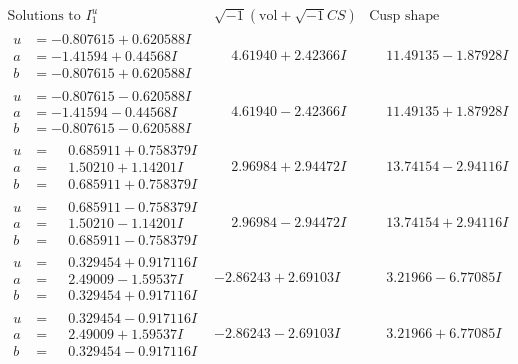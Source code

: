 \documentclass[1p]{elsarticle_modified}
\theoremstyle{definition}
\newcommand{\I}{\sqrt{-1}}
\begin{document}
$$\begin{array}{c|c|c}  
\text{Solutions to }I^u_{1}& \I (\text{vol} + \sqrt{-1}CS) & \text{Cusp shape}\\
 \hline 
\begin{aligned}
u &= -0.807615 + 0.620588 I \\
a &= -1.41594 + 0.44568 I \\
b &= -0.807615 + 0.620588 I\end{aligned}
 & \phantom{-}4.61940 + 2.42366 I & \phantom{-}11.49135 - 1.87928 I \\ \hline\begin{aligned}
u &= -0.807615 - 0.620588 I \\
a &= -1.41594 - 0.44568 I \\
b &= -0.807615 - 0.620588 I\end{aligned}
 & \phantom{-}4.61940 - 2.42366 I & \phantom{-}11.49135 + 1.87928 I \\ \hline\begin{aligned}
u &= \phantom{-}0.685911 + 0.758379 I \\
a &= \phantom{-}1.50210 + 1.14201 I \\
b &= \phantom{-}0.685911 + 0.758379 I\end{aligned}
 & \phantom{-}2.96984 + 2.94472 I & \phantom{-}13.74154 - 2.94116 I \\ \hline\begin{aligned}
u &= \phantom{-}0.685911 - 0.758379 I \\
a &= \phantom{-}1.50210 - 1.14201 I \\
b &= \phantom{-}0.685911 - 0.758379 I\end{aligned}
 & \phantom{-}2.96984 - 2.94472 I & \phantom{-}13.74154 + 2.94116 I \\ \hline\begin{aligned}
u &= \phantom{-}0.329454 + 0.917116 I \\
a &= \phantom{-}2.49009 - 1.59537 I \\
b &= \phantom{-}0.329454 + 0.917116 I\end{aligned}
 & -2.86243 + 2.69103 I & \phantom{-}3.21966 - 6.77085 I \\ \hline\begin{aligned}
u &= \phantom{-}0.329454 - 0.917116 I \\
a &= \phantom{-}2.49009 + 1.59537 I \\
b &= \phantom{-}0.329454 - 0.917116 I\end{aligned}
 & -2.86243 - 2.69103 I & \phantom{-}3.21966 + 6.77085 I \\ \hline\begin{aligned}

\end{aligned}
\end{array}$$
\end{document}
